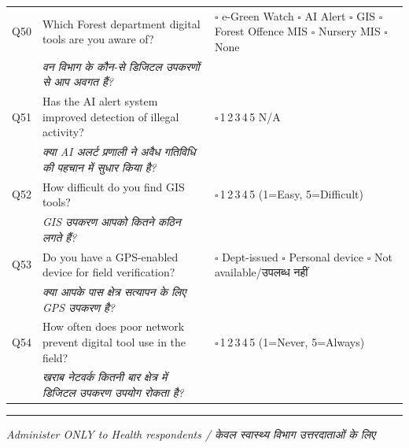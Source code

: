 \documentclass[10pt,a4paper]{article}
\newcommand{\likert}{{\Large$\square$}\,1\quad{\Large$\square$}\,2\quad{\Large$\square$}\,3\quad{\Large$\square$}\,4\quad{\Large$\square$}\,5}
\begin{document}
\noindent\begin{tabularx}{\textwidth}{@{}L{0.8cm} X L{5.2cm}@{}}
Q50 & Which Forest department digital tools are you aware of? & {\Large$\square$} e-Green Watch {\Large$\square$} AI Alert {\Large$\square$} GIS {\Large$\square$} Forest Offence MIS {\Large$\square$} Nursery MIS {\Large$\square$} None \\
 & {\hindifont\small\itshape\color{black!70} वन विभाग के कौन-से डिजिटल उपकरणों से आप अवगत हैं?} & \\[3pt]
Q51 & Has the AI alert system improved detection of illegal activity? & \likert{}\quad{\Large$\square$} N/A \\
 & {\hindifont\small\itshape\color{black!70} क्या AI अलर्ट प्रणाली ने अवैध गतिविधि की पहचान में सुधार किया है?} & \\[3pt]
Q52 & How difficult do you find GIS tools? & \likert{} {\scriptsize(1=Easy, 5=Difficult)} \\
 & {\hindifont\small\itshape\color{black!70} GIS उपकरण आपको कितने कठिन लगते हैं?} & \\[3pt]
Q53 & Do you have a GPS-enabled device for field verification? & {\Large$\square$} Dept-issued {\Large$\square$} Personal device {\Large$\square$} Not available/{\hindifont उपलब्ध नहीं} \\
 & {\hindifont\small\itshape\color{black!70} क्या आपके पास क्षेत्र सत्यापन के लिए GPS उपकरण है?} & \\[3pt]
Q54 & How often does poor network prevent digital tool use in the field? & \likert{} {\scriptsize(1=Never, 5=Always)} \\
 & {\hindifont\small\itshape\color{black!70} खराब नेटवर्क कितनी बार क्षेत्र में डिजिटल उपकरण उपयोग रोकता है?} & \\[3pt]
\end{tabularx}
\vspace{3pt}
\noindent\rule{\textwidth}{0.3pt}\vspace{3pt}
\vspace{3pt}

\small\textit{Administer ONLY to Health respondents / {\hindifont केवल स्वास्थ्य विभाग उत्तरदाताओं के लिए}}\vspace{3pt}
\end{document}
